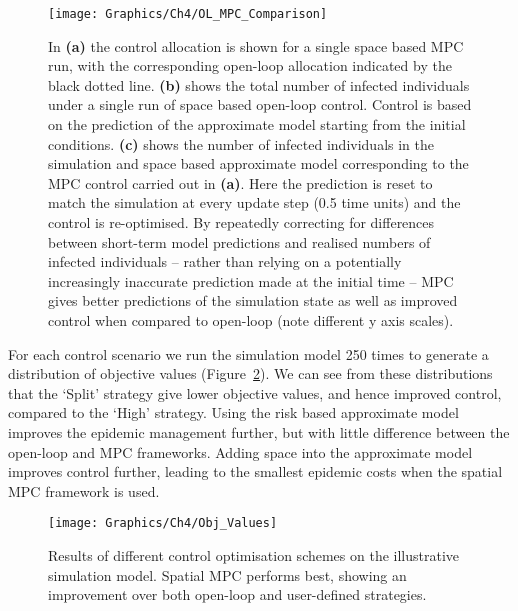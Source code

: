 \begin{figure}[h]
    \begin{center}
        \texttt{[image: Graphics/Ch4/OL\_MPC\_Comparison]}
        \caption{In \textbf{(a)} the control allocation is shown for a single space based MPC run, with the corresponding open-loop allocation indicated by the black dotted line. \textbf{(b)} shows the total number of infected individuals under a single run of space based open-loop control. Control is based on the prediction of the approximate model starting from the initial conditions. \textbf{(c)} shows the number of infected individuals in the simulation and space based approximate model corresponding to the MPC control carried out in \textbf{(a)}. Here the prediction is reset to match the simulation at every update step (0.5 time units) and the control is re-optimised. By repeatedly correcting for differences between short-term model predictions and realised numbers of infected individuals -- rather than relying on a potentially increasingly inaccurate prediction made at the initial time -- MPC gives better predictions of the simulation state as well as improved control when compared to open-loop (note different y axis scales).}
        \label{fig:ch4:ol_mpc_comparison}
    \end{center}
\end{figure}

For each control scenario we run the simulation model 250 times to generate a distribution of objective values (Figure~\ref{fig:ch4:obj_values}). We can see from these distributions that the `Split' strategy give lower objective values, and hence improved control, compared to the `High' strategy. Using the risk based approximate model improves the epidemic management further, but with little difference between the open-loop and MPC frameworks. Adding space into the approximate model improves control further, leading to the smallest epidemic costs when the spatial MPC framework is used.

\begin{figure}[h]
    \begin{center}
        \texttt{[image: Graphics/Ch4/Obj\_Values]}
        \caption{Results of different control optimisation schemes on the illustrative simulation model. Spatial MPC performs best, showing an improvement over both open-loop and user-defined strategies.}
        \label{fig:ch4:obj_values}
    \end{center}
\end{figure}

